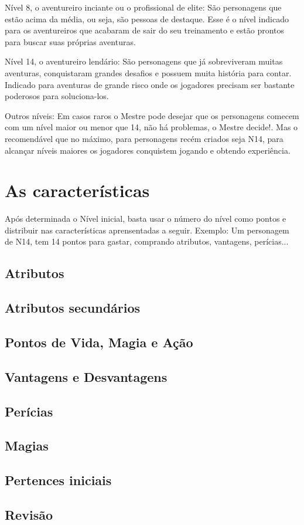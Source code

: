 Nível 8, o aventureiro inciante ou o profissional de elite: São personagens que estão acima da média, ou seja, são pessoas de destaque. Esse é o nível indicado para os aventureiros que acabaram de sair do seu treinamento e estão prontos para buscar suas próprias aventuras.

Nível 14, o aventureiro lendário: São personagens que já sobreviveram muitas aventuras, conquistaram grandes desafios e possuem muita história para contar. Indicado para aventuras de grande risco onde os jogadores precisam ser bastante poderosos para soluciona-los.

Outros níveis: Em casos raros o Mestre pode desejar que os personagens comecem com um nível maior ou menor que 14, não há problemas, o Mestre decide!. Mas o recomendável que no máximo, para personagens recém criados seja N14, para alcançar níveis maiores os jogadores conquistem jogando e obtendo experiência.

\section{As características}

Após determinada o Nível inicial, basta usar o número do nível como pontos e distribuir nas características aprensentadas a seguir. Exemplo: Um personagem de N14, tem 14 pontos para gastar, comprando atributos, vantagens, perícias...

\subsection{Atributos}

\subsection{Atributos secundários}

\subsection{Pontos de Vida, Magia e Ação}

\subsection{Vantagens e Desvantagens}

\subsection{Perícias}

\subsection{Magias}

\subsection{Pertences iniciais}

\subsection{Revisão}





